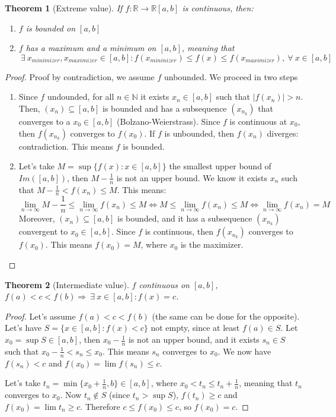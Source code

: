 \documentclass{article}
\newcommand{\abs}[1]{\left|#1\right|}
\newcommand{\Ar}{\Rightarrow}
\newenvironment{enumarabic}{\begin{enumerate}[label=(\arabic*)]}{\end{enumerate}}
\newenvironment{enumrom}{\begin{enumerate}[label=(\roman*)]}{\end{enumerate}}
\newcommand{\fr}[2]{\frac{#1}{#2}}
\newcommand{\fOnR}[1]{#1 : \mathbb{R} \rightarrow \mathbb{R}}
\newcommand{\intcc}[1]{\left[#1\right]}
\newcommand{\limn}{\lim_{n \to \infty}}
\theoremstyle{definition}
\theoremstyle{definition}
\theoremstyle{plain}
\newtheorem{theorem}{Theorem}[section]
\theoremstyle{plain}
\theoremstyle{plain}
\theoremstyle{plain}
\theoremstyle{definition}
\theoremstyle{remark}
\theoremstyle{remark}
\theoremstyle{remark}
\theoremstyle{remark}
\newcommand{\N}{\mathbb{N}}
\newcommand{\ForAll}{\ \forall \ }
\newcommand{\Exists}{\ \exists \ }
\begin{document}
\begin{theorem}[Extreme value]
  If $\fOnR{f}{\intcc{a,b}}$ is continuous, then:
  \begin{enumrom}
    \item $f$ is bounded on $\intcc{a,b}$
    \item $f$ has a maximum and a minimum on $\intcc{a,b}$, meaning that
      \[
      \Exists x_{minimizer}, x_{maximizer} \in \intcc{a,b} :
      f(x_{mininizer}) \leq f(x) \leq f(x_{maximizer}), \ForAll x \in \intcc{a,b}
      \]
  \end{enumrom}
\end{theorem}

\begin{proof}
  Proof by contradiction, we assume $f$ unbounded. We proceed in two steps
  \begin{enumarabic}
    \item Since $f$ undounded, for all $n \in \N$ it exists $x_n \in \intcc{a,b}$ such that $\abs{f(x_n)} > n$. Then, $(x_n) \subseteq \intcc{a,b}$ is bounded and has a subsequence $(x_{n_k})$ that converges to a $x_0 \in \intcc{a,b}$ (Bolzano-Weierstrass). Since $f$ is continuous at $x_0$, then $f(x_{n_k})$ converges to $f(x_0)$. If $f$ is unbounded, then $f(x_n)$ diverges: contradiction. This means $f$ is bounded.
    \item Let's take $M = \sup\{ f(x) : x \in \intcc{a,b} \}$ the smallest upper
    bound of $Im(\intcc{a,b})$, then $M - \frac{1}{n}$ is not an upper bound.
    We know it exists $x_n$ such that $M - \frac{1}{n} < f(x_n) \leq M$. This
    means:
    \[
    \limn{M - \fr{1}{n}} \leq \limn{f(x_n)} \leq M \iff
    M \leq \limn{f(x_n)} \leq M \iff \limn{f(x_n)} = M
    \]
    Moreover, $(x_n) \subseteq \intcc{a,b}$ is bounded, and it has a subsequence $(x_{n_k})$ convergent to $x_0 \in \intcc{a,b}$. Since $f$ is continuous, then $f(x_{n_k})$ converges to $f(x_0)$. This means $f(x_0) = M$, where $x_0$ is the maximizer.
  \end{enumarabic}
\end{proof}


\begin{theorem}[Intermediate value]
  $f$ continuous on $\intcc{a,b}$, $f(a) < c < f(b) \Ar \Exists x \in \intcc{a,b} : f(x) = c$.
\end{theorem}

\begin{proof}
  Let's assume $f(a) < c < f(b)$ (the same can be done for the opposite). Let's have $S = \{ x \in \intcc{a,b} : f(x) < c \}$ not empty, since at least $f(a) \in S$. Let $x_0 = \sup S \in \intcc{a,b}$, then $x_0 - \frac{1}{n}$ is not an upper bound, and it exists $s_n \in S$ such that $x_0 - \frac{1}{n} < s_n \leq x_0$. This means $s_n$ converges to $x_0$. We now have $f(s_n) < c$ and $f(x_0) = \lim f(s_n) \leq c$.
  
  Let's take $t_n = \min \{ x_0 + \fr{1}{n}, b \} \in \intcc{a,b}$, where $x_0 < t_n \leq t_n + \fr{1}{n}$, meaning that $t_n$ converges to $x_0$. Now $t_n \notin S$ (since $t_n > \sup S$), $f(t_n) \geq c$ and $f(x_0) = \lim t_n \geq c$. Therefore $c \leq f(x_0) \leq c$, so $f(x_0) = c$.
\end{proof}
\end{document}
